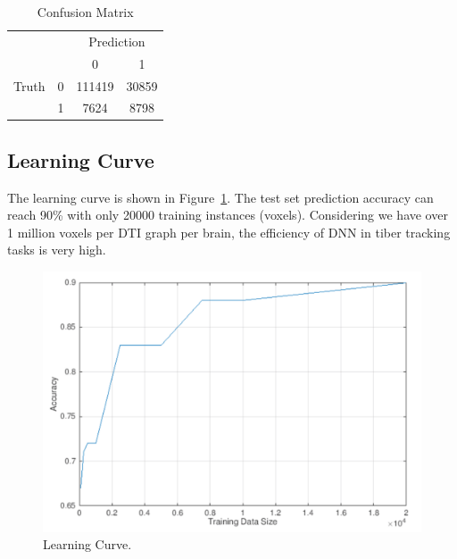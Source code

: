 \documentclass[10pt,twocolumn,letterpaper]{article}
\begin{document}
	\begin{table}[h]
		\begin{center}
			\begin{tabular}{|cc|c|c|}
				\hline
				& & \multicolumn{2}{c|}{Prediction} \\ \cline{3-4}
				& & 0 & 1\\
				\hline
				\multicolumn{1}{|c}{Truth} & \multicolumn{1}{|c|}{0} & 111419 & 30859\\ \cline{2-4}
				\multicolumn{1}{|c}{} & \multicolumn{1}{|c|}{1} & 7624 & 8798\\
				\hline
			\end{tabular}
		\end{center}
		\caption{Confusion Matrix}
		\label{table1}
	\end{table}
	
	
	\subsection{Learning Curve}
	The learning curve is shown in Figure~\ref{fig:learningcurve}. The test set prediction accuracy can reach 90\% with only 20000 training instances (voxels). Considering we have over 1 million voxels per DTI graph per brain, the efficiency of DNN in tiber tracking tasks is very high.
	
	\begin{figure}[t]
		\begin{center}
			\includegraphics[width=0.8\linewidth]{img/8.png}
		\end{center}
		\caption{Learning Curve.}
		\label{fig:learningcurve}
	\end{figure}
	
	
	
	
\end{document}
